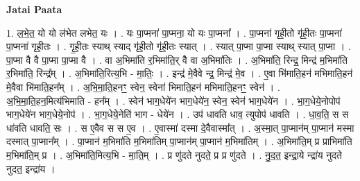 \documentclass[17pt]{extarticle}
\begin{document}
\textbf{Jatai Paata} \newline

1. ल॒भे॒त॒ यो यो ल॑भेत लभेत॒ यः । . यः पा॒प्मना॑ पा॒प्मना॒ यो यः पा॒प्मना᳚ । . पा॒प्मना॑ गृही॒तो गृ॑ही॒तः पा॒प्मना॑ पा॒प्मना॑ गृही॒तः । . गृ॒ही॒तः स्याथ् स्याद् गृ॑ही॒तो गृ॑ही॒तः स्यात् । . स्यात् पा॒प्मा पा॒प्मा स्याथ् स्यात् पा॒प्मा । . पा॒प्मा वै वै पा॒प्मा पा॒प्मा वै । . वा अ॒भिमा॑ति र॒भिमा॑ति॒र् वै वा अ॒भिमा॑तिः । . अ॒भिमा॑ति॒ रिन्द्र॒ मिन्द्र॑ म॒भिमा॑ति र॒भिमा॑ति॒ रिन्द्र᳚म् । . अ॒भिमा॑ति॒रित्य॒भि - मा॒तिः॒ । . इन्द्र॑ मे॒वैवे न्द्र॒ मिन्द्र॑ मे॒व । . ए॒वा भि॑माति॒हन॑ मभिमाति॒हन॑ मे॒वैवा भि॑माति॒हन᳚म् । . अ॒भि॒मा॒ति॒हनꣳ॒॒ स्वेन॒ स्वेना॑ भिमाति॒हन॑ मभिमाति॒हनꣳ॒॒ स्वेन॑ । . अ॒भि॒मा॒ति॒हन॒मित्य॑भिमाति - हन᳚म् । . स्वेन॑ भाग॒धेये॑न भाग॒धेये॑न॒ स्वेन॒ स्वेन॑ भाग॒धेये॑न । . भा॒ग॒धेये॒नोपोप॑ भाग॒धेये॑न भाग॒धेये॒नोप॑ । . भा॒ग॒धेये॒नेति॑ भाग - धेये॑न । . उप॑ धावति धाव॒ त्युपोप॑ धावति । . धा॒व॒ति॒ स स धा॑वति धावति॒ सः । . स ए॒वैव स स ए॒व । . ए॒वास्मा॑ दस्मा दे॒वैवास्मा᳚त् । . अ॒स्मा॒त् पा॒प्मान॑म् पा॒प्मान॑ मस्मा दस्मात् पा॒प्मान᳚म् । . पा॒प्मान॑ म॒भिमा॑ति म॒भिमा॑तिम् पा॒प्मान॑म् पा॒प्मान॑ म॒भिमा॑तिम् । . अ॒भिमा॑ति॒म् प्र प्राभिमा॑ति म॒भिमा॑ति॒म् प्र । . अ॒भिमा॑ति॒मित्य॒भि - मा॒ति॒म् । . प्र णु॑दते नुदते॒ प्र प्र णु॑दते । . नु॒द॒त॒ इन्द्रा॒ये न्द्रा॑य नुदते नुदत॒ इन्द्रा॑य । \newline
\end{document}
